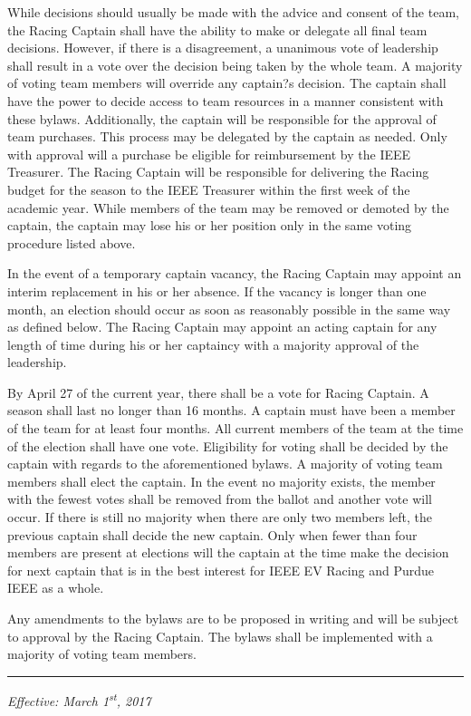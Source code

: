 \documentclass[12pt]{constitution}
\begin{document}
\label{art:decide}

While decisions should usually be made with the advice and consent of the team, the Racing Captain shall have the ability to make or delegate all final team decisions. However, if there is a disagreement, a unanimous vote of leadership shall result in a vote over the decision being taken by the whole team. A majority of voting team members will override any captain?s decision. The captain shall have the power to decide access to team resources in a manner consistent with these bylaws. Additionally, the captain will be responsible for the approval of team purchases. This process may be delegated by the captain as needed. Only with approval will a purchase be eligible for reimbursement by the IEEE Treasurer. The Racing Captain will be responsible for delivering the Racing budget for the season to the IEEE Treasurer within the first week of the academic year. While members of the team may be removed or demoted by the captain, the captain may lose his or her position only in the same voting procedure listed above.

In the event of a temporary captain vacancy, the Racing Captain may appoint an interim replacement in his or her absence. If the vacancy is longer than one month, an election should occur as soon as reasonably possible in the same way as defined below. The Racing Captain may appoint an acting captain for any length of time during his or her captaincy with a majority approval of the leadership.

\label{art:elect}

By April 27 of the current year, there shall be a vote for Racing Captain. A season shall last no longer than 16 months. A captain must have been a member of the team for at least four months. All current members of the team at the time of the election shall have one vote. Eligibility for voting shall be decided by the captain with regards to the aforementioned bylaws. A majority of voting team members shall elect the captain. In the event no majority exists, the member with the fewest votes shall be removed from the ballot and another vote will occur. If there is still no majority when there are only two members left, the previous captain shall decide the new captain. Only when fewer than four members are present at elections will the captain at the time make the decision for next captain that is in the best interest for IEEE EV Racing and Purdue IEEE as a whole.


\label{art:bylaw}

Any amendments to the bylaws are to be proposed in writing and will be subject to approval by the Racing Captain. The bylaws shall be implemented with a majority of voting team members.

\vspace{12pt}
\hrule

\textit{Effective: March 1\textsuperscript{st}, 2017}


\setcounter{tocdepth}{1}
\listoftodos %
\end{document}
